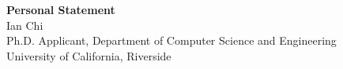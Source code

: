 \documentclass[11pt]{article}
\begin{document}
\begin{center}
    {\Large \textbf{Personal Statement}}\\[4pt]
    {\large Ian Chi}\\[2pt]
    Ph.D. Applicant, Department of Computer Science and Engineering\\
    University of California, Riverside
\end{center}

\vspace{1em}

\end{document}
